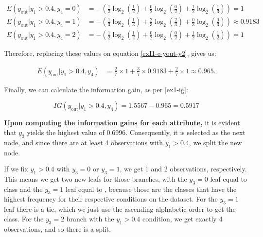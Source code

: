 \documentclass[12pt]{article}
\begin{document}
\begin{enumerate}[leftmargin=\labelsep]
        \[
          \begin{aligned}
            E(y_{\text{out}} | y_1 > 0.4 , y_4 = 0) & = - \left(\frac{1}{2} \log_2\left(\frac{1}{2}\right) + \frac{0}{2} \log_2\left(\frac{0}{2}\right)
            + \frac{1}{2} \log_2\left(\frac{1}{3}\right)\right) = 1                                                                                     \\
            E(y_{\text{out}} | y_1 > 0.4 , y_4 = 1) & = - \left(\frac{1}{3} \log_2\left(\frac{1}{3}\right) + \frac{2}{3} \log_2\left(\frac{2}{3}\right)
            + \frac{0}{3} \log_2\left(\frac{0}{3}\right)\right) \approx 0.9183                                                                          \\
            E(y_{\text{out}} | y_1 > 0.4 , y_4 = 2) & = - \left(\frac{1}{2} \log_2\left(\frac{1}{2}\right) + \frac{0}{2} \log_2\left(\frac{0}{2}\right)
            + \frac{1}{2} \log_2\left(\frac{1}{2}\right)\right) = 1
          \end{aligned}
        \]

        Therefore, replacing these values on equation \eqref{exI1-e-yout-y2}, gives us:

        \[
          \begin{aligned}
            E(y_{\text{out}} | y_1>0.4, y_4) & = \frac{2}{7} \times 1 + \frac{3}{7} \times 0.9183 +  \frac{2}{7} \times 1 \approx 0.965.
          \end{aligned}
        \]

        Finally, we can calculate the information gain, as per \eqref{ex1-ig}:

        \[
          IG(y_{\text{out}} | y_1 > 0.4, y_4) = 1.5567 - 0.965 = 0.5917
        \]

        \textbf{Upon computing the information gains for each attribute,} it is evident that $y_3$ yields the highest value of 0.6996. Consequently,
        it is selected as the next node, and since there are at least 4 observations with $y_1 > 0.4$, we split the new node.

        If we fix $y_1 > 0.4$ with $y_3 = 0$ or $y_3 = 1$, we get 1 and 2 observations, respectively. This means we get two new leafs for those branches, with
        the $y_3 = 0$ leaf equal to class  and the $y_3 = 1$ leaf equal to , because those are the classes that have the highest frequency for
        their respective conditions on the dataset. For the $y_3 = 1$ leaf there is a tie, which we just use the ascending alphabetic order to get the class.
        For the $y_3 = 2$ branch with the $y_1 > 0.4$ condition, we get exactly 4 observations, and so there is a split.


\end{enumerate}
\end{document}
